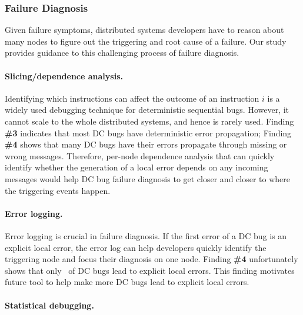 
\subsubsection{Failure Diagnosis}
\label{less-diagnose}


Given failure symptoms, distributed systems developers have to reason 
about many nodes to figure out the triggering and root cause of 
a failure.
Our study provides guidance to this challenging process of
failure diagnosis.

\paragraph{Slicing/dependence analysis.} 

Identifying which instructions can affect the outcome of an
instruction $i$ is a widely used debugging technique for deterministic
sequential bugs.  However, it cannot scale to the whole distributed
systems, and hence is rarely used.
%
%
Finding {\bf \#3} indicates that most DC bugs have deterministic error
propagation; Finding {\bf \#4} shows that many DC bugs have their
errors propagate through missing or
wrong messages.  Therefore, per-node dependence analysis that can
quickly identify whether the generation of a local error depends on
any incoming messages would help DC bug failure diagnosis to get
closer and closer to where the triggering events happen.




\paragraph{Error logging.}  

Error logging is crucial in failure diagnosis. If the
first error of a DC bug is an explicit local error, the error log can
help developers quickly identify the triggering node and focus their
diagnosis on one node.
%
%
Finding {\bf \#4} unfortunately shows that only \pctErrLocExp\ of DC bugs
lead to explicit local errors. This finding motivates future
tool to help make more DC bugs lead to explicit local errors.


\paragraph{Statistical debugging.}

